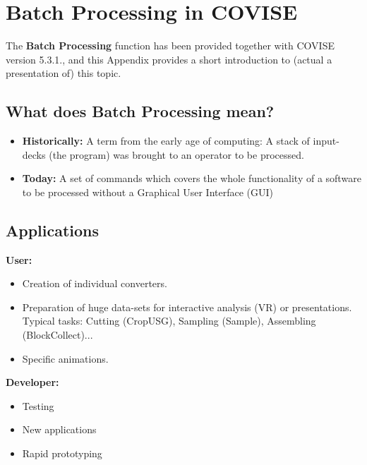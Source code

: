 
\begin{htmlonly}




\end{htmlonly}

\startdocument
\chapter{Batch Processing in COVISE}
\label{Batch_Processing}


The {\bf Batch Processing} function has been provided together with COVISE version 5.3.1., and this Appendix
provides a short introduction to (actual a presentation of) this topic.  

\section{What does Batch Processing mean?}

\begin{itemize}
\item {\bf Historically:} A term from the early age of computing: A stack of input-decks (the program) was 
brought to an operator to be processed.
\item {\bf Today:} A set of commands which covers the whole functionality of a software to be processed 
without a Graphical User Interface (GUI)
\end{itemize}

\section{Applications}

{\bf User:}
\begin{itemize}
\item  Creation of individual converters.
\item  Preparation of huge data-sets for interactive analysis (VR) 
or presentations. Typical tasks: Cutting (CropUSG), 
Sampling (Sample), Assembling (BlockCollect)...
\item Specific animations.
\end{itemize}

{\bf Developer:}
\begin{itemize}
\item Testing
\item New applications
\item Rapid prototyping
\end{itemize}

